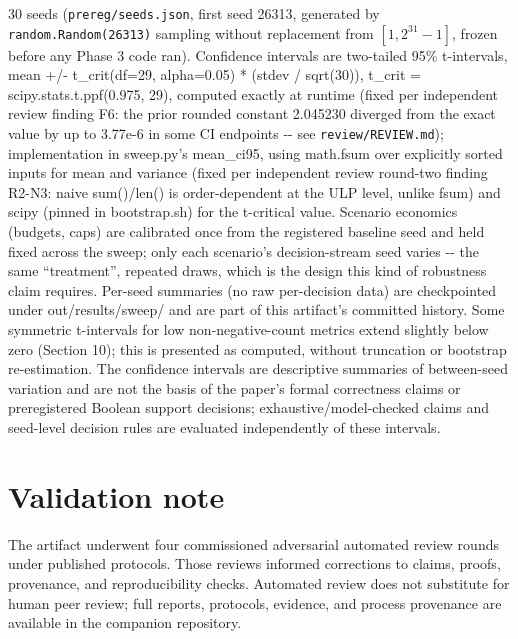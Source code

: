 \documentclass[11pt,a4paper]{article}
\theoremstyle{definition}
\begin{document}
30 seeds (\texttt{prereg/seeds.json}, first seed 26313, generated by \texttt{random.Random(26313)} sampling without replacement from $[1, 2^{31}-1]$, frozen before any Phase 3 code ran). Confidence intervals are two-tailed 95\% t-intervals, mean +/- t\_crit(df=29, alpha=0.05) * (stdev / sqrt(30)), t\_crit = scipy.stats.t.ppf(0.975, 29), computed exactly at runtime (fixed per independent review finding F6: the prior rounded constant 2.045230 diverged from the exact value by up to 3.77e-6 in some CI endpoints -{}- see \texttt{review/REVIEW.md}); implementation in sweep.py's mean\_ci95, using math.fsum over explicitly sorted inputs for mean and variance (fixed per independent review round-two finding R2-N3: naive sum()/len() is order-dependent at the ULP level, unlike fsum) and scipy (pinned in bootstrap.sh) for the t-critical value. Scenario economics (budgets, caps) are calibrated once from the registered baseline seed and held fixed across the sweep; only each scenario's decision-stream seed varies -{}- the same ``treatment'', repeated draws, which is the design this kind of robustness claim requires. Per-seed summaries (no raw per-decision data) are checkpointed under out/results/sweep/ and are part of this artifact's committed history. Some symmetric t-intervals for low non-negative-count metrics extend slightly below zero (Section 10); this is presented as computed, without truncation or bootstrap re-estimation. The confidence intervals are descriptive summaries of between-seed variation and are not the basis of the paper's formal correctness claims or preregistered Boolean support decisions; exhaustive/model-checked claims and seed-level decision rules are evaluated independently of these intervals.

\section*{Validation note}

The artifact underwent four commissioned adversarial automated review rounds under published protocols. Those reviews informed corrections to claims, proofs, provenance, and reproducibility checks. Automated review does not substitute for human peer review; full reports, protocols, evidence, and process provenance are available in the companion repository.
\end{document}

